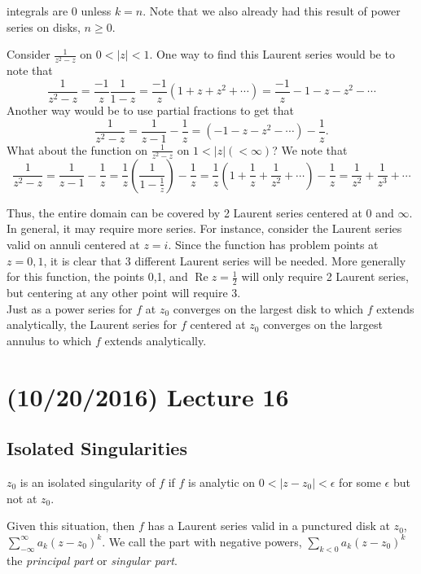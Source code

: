 \documentclass[11pt,leqno,oneside]{amsart}
\renewcommand{\Re}{\operatorname{Re}}
\begin{document}
  integrals are 0 unless $k=n$. Note that we also already had this
  result of power series on disks, $n \geq 0$.
  \begin{example}
    Consider $\frac{1}{z^2-z}$ on $0 < |z| < 1$. One way to find this
    Laurent series would be to note that \[
      \frac{1}{z^2-z} = \frac{-1}{z}\frac{1}{1-z} =
      \frac{-1}{z}(1+z+z^2+\cdots) = \frac{-1}{z}-1-z-z^2-\cdots
    \]
    Another way would be to use partial fractions to get that \[
      \frac{1}{z^2-z} = \frac{1}{z-1} - \frac{1}{z} =
      (-1-z-z^2-\cdots) - \frac{1}{z}.
    \]
    What about the function on $\frac{1}{z^2-z}$ on $1 < |z| (<
    \infty)$? We note that \[
      \frac{1}{z^2-z} = \frac{1}{z-1} - \frac{1}{z} =
      \frac{1}{z}\left(\frac{1}{1-\frac{1}{z}}\right) - \frac{1}{z} =
      \frac{1}{z}\left( 1 + \frac{1}{z} + \frac{1}{z^2} + \cdots \right) -
        \frac{1}{z} = \frac{1}{z^2} + \frac{1}{z^3} + \cdots
    \]
  \end{example}
  Thus, the entire domain can be covered by 2 Laurent series centered
  at 0 and $\infty$.  In general, it may require more series. For
  instance, consider the Laurent series valid on annuli centered at
  $z=i$. Since the function has problem points at $z=0,1$, it is clear
  that 3 different Laurent series will be needed. More generally for
  this function, the points 0,1, and $\Re z = \frac{1}{2}$ will only
  require 2 Laurent series, but centering at any other point will
  require 3. \\

  Just as a power series for $f$ at $z_0$ converges on the largest
  disk to which $f$ extends analytically, the Laurent series for $f$
  centered at $z_0$ converges on the largest annulus to which $f$
  extends analytically.

  \section{(10/20/2016) Lecture 16}
  \subsection*{Isolated Singularities}
  \begin{defn}
    $z_0$ is an isolated singularity of $f$ if $f$ is analytic on $0 <
    |z-z_0| < \epsilon$ for some $\epsilon$ but not at $z_0$.
  \end{defn}
  Given this situation, then $f$ has a Laurent series valid in a
  punctured disk at $z_0$, $\sum_{-\infty}^\infty a_k(z-z_0)^k$. We
  call the part with negative powers, $\sum_{k < 0} a_k(z-z_0)^k$ the
  \emph{principal part} or \emph{singular part}.
\end{document}
